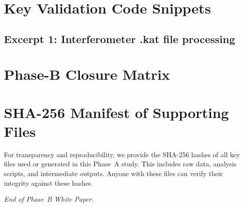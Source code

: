 \documentclass[12pt]{article}
\begin{document}
\appendix
\section{Key Validation Code Snippets}\label{app:code}
\subsection*{Excerpt 1: Interferometer .kat file processing}

\section{Phase-B Closure Matrix}

\section{SHA-256 Manifest of Supporting Files}\label{app:manifest}
For transparency and reproducibility, we provide the SHA-256 hashes of all key files used or generated in this Phase~A study. This includes raw data, analysis scripts, and intermediate outputs. Anyone with these files can verify their integrity against these hashes.


\textit{End of Phase~B White Paper.}
\end{document}

